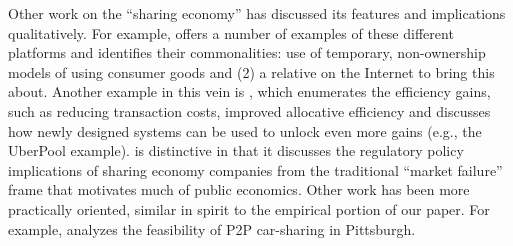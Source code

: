 \documentclass[11pt]{article}
\begin{document}
Other work on the ``sharing economy'' has discussed its features and implications qualitatively. 
For example, \cite{belk2014you} offers a number of examples of these different platforms and identifies their commonalities: use of temporary, non-ownership models of using consumer goods and (2) a relative on the Internet to bring this about. 
Another example in this vein is \cite{edelman2015efficiencies}, which enumerates the efficiency gains, such as reducing transaction costs, improved allocative efficiency and discusses how newly designed systems can be used to unlock even more gains (e.g., the UberPool example). 
\cite{edelman2015efficiencies} is distinctive in that it discusses the regulatory policy implications of sharing economy companies from the traditional ``market failure'' frame that motivates much of public economics.  
Other work has been more practically oriented, similar in spirit to the empirical portion of our paper.
For example, \cite{hampshire2011peer} analyzes the feasibility of P2P car-sharing in Pittsburgh.


% 


 
\end{document}
